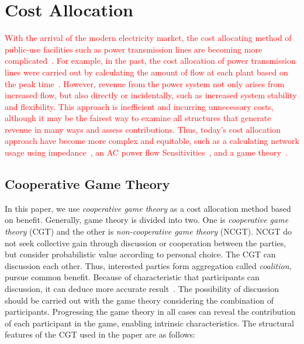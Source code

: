 \documentclass[journal]{IEEEtran} %
\begin{document}

\section{Cost Allocation}
\textcolor{red}{With the arrival of the modern electricity market, the cost allocating method of public-use facilities such as power transmission lines are becoming more complicated~\cite{Kirschen2018}. For example, in the past, the cost allocation of power transmission lines were carried out by calculating the amount of flow at each plant based on the peak time~\cite{shahide}. However, revenue from the power system not only arises from increased flow, but also directly or incidentally, such as increased system stability and flexibility. This approach is inefficient and incurring unnecessary costs, although it may be the fairest way to examine all structures that generate revenue in many ways and assess contributions. Thus, today's cost allocation approach have become more complex and equitable, such as a calculating network usage using impedance~\cite{conejo2007z}, an AC power flow Sensitivities~\cite{chaitusaney2002ac}, and a game theory~\cite{zolezzi2002}.}

\subsection{Cooperative Game Theory}
In this paper, we use \textit{cooperative game theory} as a cost allocation method based on benefit. Generally, game theory is divided into two. One is \textit{cooperative game theory} (CGT) and the other is \textit{non-cooperative game theory} (NCGT). NCGT do not seek collective gain through discussion or cooperation between the parties, but consider probabilistic value according to personal choice. The CGT can discussion each other. Thus, interested parties form aggregation called \textit{coalition}, pursue common benefit. Because of characteristic that participants can discussion, it can deduce more accurate result~\cite{zolezzi2002}. The possibility of discussion should be carried out with the game theory considering the combination of participants. Progressing the game theory in all cases can reveal the contribution of each participant in the game, enabling intrinsic characteristics. The structural features of the CGT used in the paper are as follows:
\end{document}
